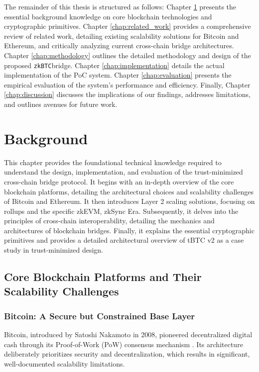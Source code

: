 \documentclass{DESSThesis}
\newcommand{\zktoken}{\texttt{zkBTC}}
\begin{document}
The remainder of this thesis is structured as follows: Chapter \ref{chap:background} presents the essential background knowledge on core blockchain technologies and cryptographic primitives. Chapter \ref{chap:related_work} provides a comprehensive review of related work, detailing existing scalability solutions for Bitcoin and Ethereum, and critically analyzing current cross-chain bridge architectures.  Chapter \ref{chap:methodology} outlines the detailed methodology and design of the proposed \zktoken bridge. Chapter \ref{chap:implementation} details the actual implementation of the PoC system. Chapter \ref{chap:evaluation} presents the empirical evaluation of the system's performance and efficiency. Finally, Chapter \ref{chap:discussion} discusses the implications of our findings, addresses limitations, and outlines avenues for future work.


\chapter{Background} \label{chap:background}
\thispagestyle{empty}

This chapter provides the foundational technical knowledge required to understand the design, implementation, and evaluation of the trust-minimized cross-chain bridge protocol. It begins with an in-depth overview of the core blockchain platforms, detailing the architectural choices and scalability challenges of Bitcoin and Ethereum. It then introduces Layer 2 scaling solutions, focusing on rollups and the specific zkEVM, zkSync Era. Subsequently, it delves into the principles of cross-chain interoperability, detailing the mechanics and architectures of blockchain bridges. Finally, it explains the essential cryptographic primitives and provides a detailed architectural overview of tBTC v2 as a case study in trust-minimized design.

\section{Core Blockchain Platforms and Their Scalability Challenges}
\label{sec:core_blockchain_platforms}

\subsection{Bitcoin: A Secure but Constrained Base Layer}
\label{subsec:bitcoin_l1}
Bitcoin, introduced by Satoshi Nakamoto in 2008, pioneered decentralized digital cash through its Proof-of-Work (PoW) consensus mechanism \cite{nakamoto_bitcoin_nodate}. Its architecture deliberately prioritizes security and decentralization, which results in significant, well-documented scalability limitations.
\end{document}
